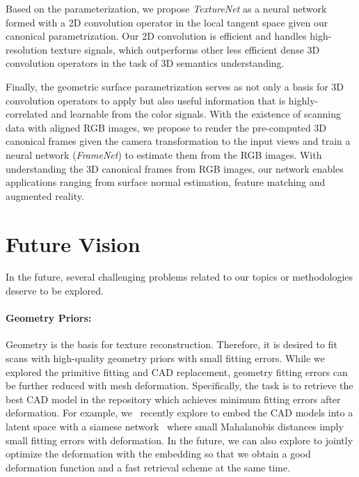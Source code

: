 Based on the parameterization, we propose \emph{TextureNet} as a neural network formed with a 2D convolution operator in the local tangent space given our canonical parametrization.
%
Our 2D convolution is efficient and handles high-resolution texture signals, which outperforms other less efficient dense 3D convolution operators in the task of 3D semantics understanding.

Finally, the geometric surface parametrization serves as not only a basis for 3D convolution operators to apply but also useful information that is highly-correlated and learnable from the color signals. With the existence of scanning data with aligned RGB images, we propose to render the pre-computed 3D canonical frames given the camera transformation to the input views and train a neural network (\emph{FrameNet}) to estimate them from the RGB images. With understanding the 3D canonical frames from RGB images, our network enables applications ranging from surface normal estimation, feature matching and augmented reality. 

\section{Future Vision}
In the future, several challenging problems related to our topics or methodologies deserve to be explored.

\paragraph*{Geometry Priors:} Geometry is the basis for texture reconstruction. Therefore, it is desired to fit scans with high-quality geometry priors with small fitting errors. While we explored the primitive fitting and CAD replacement, geometry fitting errors can be further reduced with mesh deformation. Specifically, the task is to retrieve the best CAD model in the repository which achieves minimum fitting errors after deformation. For example, we~\cite{uy2020deformation} recently explore to embed the CAD models into a latent space with a siamese network~\cite{finn2017model} where small Mahalanobis distances imply small fitting errors with deformation. In the future, we can also explore to jointly optimize the deformation with the embedding so that we obtain a good deformation function and a fast retrieval scheme at the same time.

